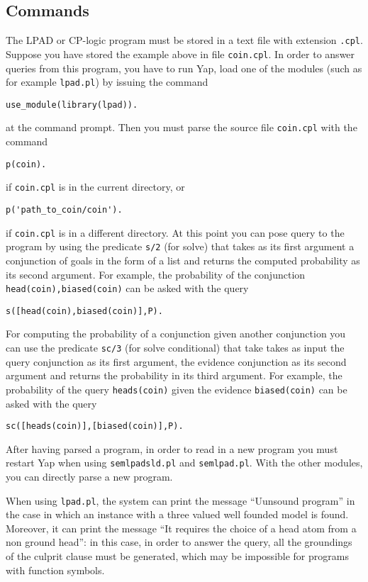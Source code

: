 \documentclass[a4paper,10pt]{scrartcl}
\begin{document}
\subsection{Commands}
The LPAD or CP-logic program must be stored in a text file with extension \texttt{.cpl}. Suppose you have stored the example above in file \texttt{coin.cpl}. 
In order to answer queries from this program, you have to run Yap,
load one of the modules (such as for example \texttt{lpad.pl}) by issuing  the command
\begin{verbatim}
use_module(library(lpad)).
\end{verbatim}
at the command prompt.
Then you must parse the source file \texttt{coin.cpl}  with the command
\begin{verbatim}
p(coin).
\end{verbatim}
if \texttt{coin.cpl} is in the current directory, or 
\begin{verbatim}
p('path_to_coin/coin').
\end{verbatim}
if \texttt{coin.cpl} is in a different directory.
At this point you can pose query to the program by using the predicate \texttt{s/2} (for solve) that takes as its first argument a conjunction of goals in the form of a list and returns the computed probability as its second argument. For example, the probability of the conjunction \texttt{head(coin),biased(coin)} can be asked with the query
\begin{verbatim}
s([head(coin),biased(coin)],P).
\end{verbatim}
For computing the probability of a conjunction given another conjunction you can use the predicate \texttt{sc/3} (for solve conditional) that take takes as input the query conjunction as its first argument, the evidence conjunction as its second argument and returns the probability in its third argument.
For example, the probability of  the query \texttt{heads(coin)} given the evidence \texttt{biased(coin)} can be asked with the query
\begin{verbatim}
sc([heads(coin)],[biased(coin)],P).
\end{verbatim}
After having parsed a program, in order to read in a new program you must restart Yap when using 
\texttt{semlpadsld.pl} and \texttt{semlpad.pl}. With the other modules, you can directly parse a new program.

When using \texttt{lpad.pl}, the system can print the message ``Uunsound program'' in the case in which an instance with a three valued well founded model is found.  Moreover, it can print the message ``It requires the choice of a head atom from a non ground head'': in this case, in order to answer the query, all the groundings of the culprit clause must be generated, which may be impossible for programs with function symbols. 
\end{document}
